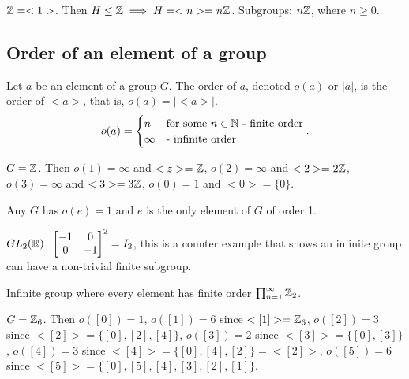 \documentclass[]{article}
\begin{document}
\begin{example}
	$\mathbb{Z} = <1>$. Then $H\leq \mathbb{Z} \implies H = <n> = n\mathbb{Z}$. Subgroups: $n\mathbb{Z}$, where $n\geq 0$.
\end{example}

\subsection{Order of an element of a group}
\begin{definition}
	Let $a$ be an element of a group $G$. The \ul{order of $a$}, denoted $o(a)$ or $|a|$, is the order of $<a>$, that is, $o(a) = |<a>|$.
	$$o(a) = \begin{cases} n & \text{for some } n\in\mathbb{N} \text{ - finite order} \\ \infty & \text{- infinite order} \end{cases}. $$
\end{definition}
\begin{example}
	$G = \mathbb{Z}$. Then $o(1) = \infty$ and $<z> = \mathbb{Z}$, $o(2) = \infty$ and $<2> = 2\mathbb{Z}$, $o(3) = \infty$ and $<3> = 3\mathbb{Z}$, $o(0) = 1$ and $<0> = \{0\}$.
\end{example}
\begin{note}
	Any $G$ has $o(e) = 1$ and $e$ is the only element of $G$ of order 1.
\end{note}
\begin{example}
	$GL_2(\mathbb{R})$, $\begin{bmatrix}-1&0 \\0&-1\end{bmatrix}^2 = I_2$, this is a counter example that shows an infinite group can have a non-trivial finite subgroup.
\end{example}
\begin{example}
	Infinite group where every element has finite order $\prod_{n=1}^\infty \mathbb{Z}_2$.
\end{example}
\begin{example}
	$G = \mathbb{Z}_6$. Then $o([0]) = 1$, $o([1]) = 6$ since $<[1]> = \mathbb{Z}_6$, $o([2]) = 3$ since $<[2]> = \{[0],[2],[4]\}$, $o([3]) = 2$ since $<[3]> = \{[0],[3]\}$, $o([4]) = 3$ since $<[4]> = \{[0],[4],[2]\} = <[2]>$, $o([5]) = 6$ since $<[5]> = \{[0],[5],[4],[3],[2],[1]\}$.
\end{example}
\end{document}
